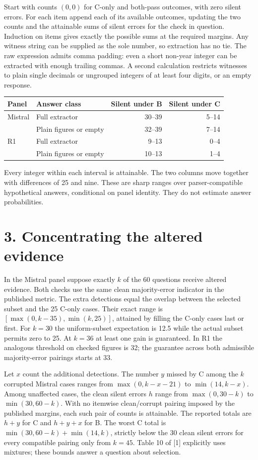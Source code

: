\documentclass[11pt]{article}
\begin{document}
Start with counts $(0,0)$ for C-only and both-pass outcomes, with zero silent errors. For each item append each of its available outcomes, updating the two counts and the attainable sums of silent errors for the check in question. Induction on items gives exactly the possible sums at the required margins. Any witness string can be supplied as the sole number, so extraction has no tie. The raw expression admits comma padding: even a short non-year integer can be extracted with enough trailing commas. A second calculation restricts witnesses to plain single decimals or ungrouped integers of at least four digits, or an empty response.

\begin{center}\begin{tabular}{llrr}\toprule
Panel & Answer class & Silent under B & Silent under C\\\midrule
Mistral & Full extractor &30--39&5--14\\
 & Plain figures or empty &32--39&7--14\\
R1 & Full extractor &9--13&0--4\\
 & Plain figures or empty &10--13&1--4\\\bottomrule
\end{tabular}\end{center}
Every integer within each interval is attainable. The two columns move together with differences of 25 and nine. These are sharp ranges over parser-compatible hypothetical answers, conditional on panel identity. They do not estimate answer probabilities.
\newpage
\section*{3. Concentrating the altered evidence}
In the Mistral panel suppose exactly $k$ of the 60 questions receive altered evidence. Both checks use the same clean majority-error indicator in the published metric. The extra detections equal the overlap between the selected subset and the 25 C-only cases. Their exact range is $[\max(0,k-35),\min(k,25)]$, attained by filling the C-only cases last or first. For $k=30$ the uniform-subset expectation is 12.5 while the actual subset permits zero to 25. At $k=36$ at least one gain is guaranteed. In R1 the analogous threshold on checked figures is 32; the guarantee across both admissible majority-error pairings starts at 33.

Let $x$ count the additional detections. The number $y$ missed by C among the $k$ corrupted Mistral cases ranges from $\max(0,k-x-21)$ to $\min(14,k-x)$. Among unaffected cases, the clean silent errors $h$ range from $\max(0,30-k)$ to $\min(30,60-k)$. With no itemwise clean/corrupt pairing imposed by the published margins, each such pair of counts is attainable. The reported totals are $h+y$ for C and $h+y+x$ for B. The worst C total is $\min(30,60-k)+\min(14,k)$, strictly below the 30 clean silent errors for every compatible pairing only from $k=45$. Table 10 of [1] explicitly uses mixtures; these bounds answer a question about selection.
\end{document}
